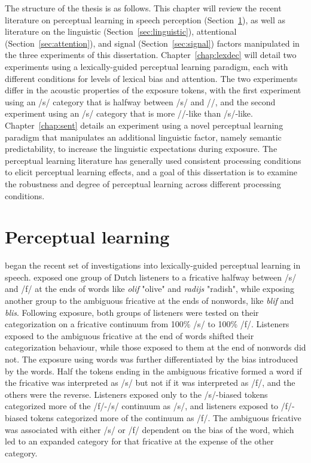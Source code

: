 The structure of the thesis is as follows.
This chapter will review the recent literature on perceptual learning in speech perception (Section~\ref{sec:perceptuallearning}), as well as literature on the linguistic (Section~\ref{sec:linguistic}), attentional (Section~\ref{sec:attention}), and signal (Section~\ref{sec:signal}) factors manipulated in the three experiments of this dissertation.
Chapter~\ref{chap:lexdec} will detail two experiments using a lexically-guided perceptual learning paradigm, each with different conditions for levels of lexical bias and attention.  
The two experiments differ in the acoustic properties of the exposure tokens, with the first experiment using an /s/ category that is halfway between /s/ and /\textesh/, and the second experiment using an /s/ category that is more /\textesh/-like than /s/-like.  
Chapter~\ref{chap:sent} details an experiment using a novel perceptual learning paradigm that manipulates an additional linguistic factor, namely semantic predictability, to increase the linguistic expectations during exposure.
The perceptual learning literature has generally used consistent processing conditions to elicit perceptual learning effects, and a goal of this dissertation is to examine the robustness and degree of perceptual learning across different processing conditions.

\section{Perceptual learning}
\label{sec:perceptuallearning}


\citet{Norris2003} began the recent set of investigations into lexically-guided perceptual learning in speech.
\citet{Norris2003} exposed one group of Dutch listeners to a fricative halfway between /s/ and /f/ at the ends of words like \emph{olif} "olive" and \emph{radijs} "radish", while exposing another group to the ambiguous fricative at the ends of nonwords, like \emph{blif} and \emph{blis}.
Following exposure, both groups of listeners were tested on their categorization on a fricative continuum from 100\% /s/ to 100\% /f/. 
Listeners exposed to the ambiguous fricative at the end of words shifted their categorization behaviour, while those exposed to them at the end of nonwords did not.  The exposure using words was further differentiated by the bias introduced by the words.  
Half the tokens ending in the ambiguous fricative formed a word if the fricative was interpreted as /s/ but not if it was interpreted as /f/, and the others were the reverse.  
Listeners exposed only to the /s/-biased tokens categorized more of the /f/-/s/ continuum as /s/, and listeners exposed to /f/-biased tokens categorized more of the continuum as /f/.  
The ambiguous fricative was associated with either /s/ or /f/ dependent on the bias of the word, which led to an expanded category for that fricative at the expense of the other category.

